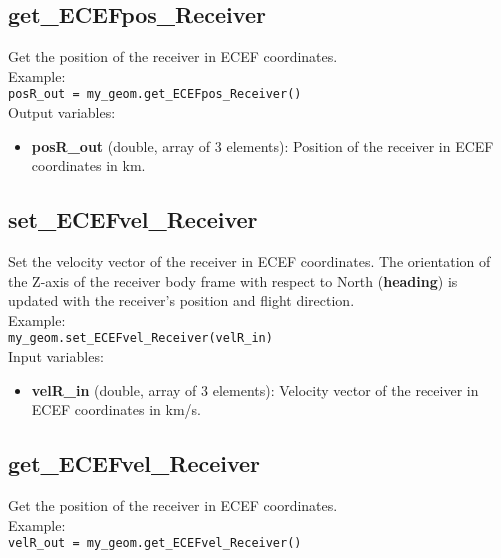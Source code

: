 \subsection{get\_ECEFpos\_Receiver}

Get the position of the receiver in ECEF coordinates.\\

Example:\\

\texttt{posR\_out = my\_geom.get\_ECEFpos\_Receiver()}\\

Output variables:
\begin{itemize}
\item {\bf posR\_out} (double, array of 3 elements): Position of the receiver in ECEF coordinates in km.
\end{itemize}


\subsection{set\_ECEFvel\_Receiver}

Set the velocity vector of the receiver in ECEF coordinates. The orientation of the Z-axis of the receiver body frame with respect to North ({\bf heading}) is updated with the receiver's position and flight direction.\\

Example:\\

\texttt{my\_geom.set\_ECEFvel\_Receiver(velR\_in)}\\

Input variables:
\begin{itemize}
\item {\bf velR\_in} (double, array of 3 elements): Velocity vector of the receiver in ECEF coordinates in km/s.
\end{itemize}


\subsection{get\_ECEFvel\_Receiver}

Get the position of the receiver in ECEF coordinates.\\

Example:\\

\texttt{velR\_out = my\_geom.get\_ECEFvel\_Receiver()}\\

